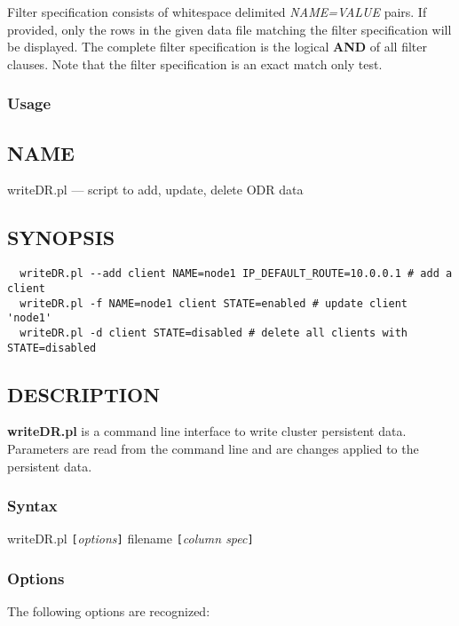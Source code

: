 Filter specification consists of whitespace delimited {\em NAME=VALUE\/} pairs. If provided,
only the rows in the given data file matching the filter specification will be displayed.
The complete filter specification is the logical {\bf AND} of all filter clauses. Note
that the filter specification is an exact match only test.

\subsubsection{ Usage}

\subsection*{NAME}
writeDR.pl --- script to add, update, delete ODR data

\subsection*{SYNOPSIS}\begin{verbatim}
  writeDR.pl --add client NAME=node1 IP_DEFAULT_ROUTE=10.0.0.1 # add a client
  writeDR.pl -f NAME=node1 client STATE=enabled # update client 'node1'
  writeDR.pl -d client STATE=disabled # delete all clients with STATE=disabled
\end{verbatim}

\subsection*{DESCRIPTION}
{\bf writeDR.pl} is a command line interface to write cluster persistent data.
Parameters are read from the command line and are changes applied to the
persistent data.

\subsubsection*{Syntax}%

writeDR.pl {\tt [}{\em options\/}{\tt ]} filename {\tt [}{\em column spec\/}{\tt ]}

\subsubsection*{Options}%

The following options are recognized:

